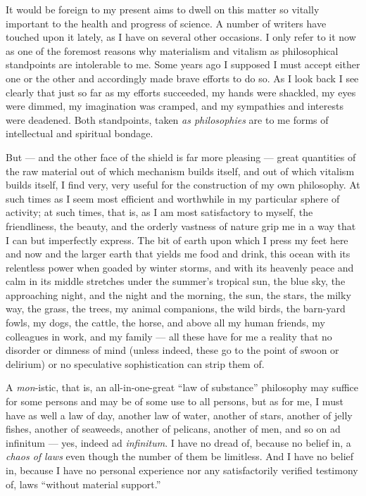 \documentclass[a4paper, 11pt, oneside, polutonikogreek, english, landscape]{article}
\begin{document}
It would be foreign to my present aims to dwell on this matter so vitally important to the health and progress of science. A number of writers have touched upon it lately, as I have on several other occasions. I only refer to it now as one of the foremost reasons why materialism and vitalism as philosophical standpoints are intolerable to me. Some years ago I supposed I must accept either one or the other and accordingly made brave efforts to do so. As I look back I see clearly that just so far as my efforts succeeded, my hands were shackled, my eyes were dimmed, my imagination was cramped, and my sympathies and interests were deadened. Both standpoints, taken \emph{as philosophies} are to me forms of intellectual and spiritual bondage.

But --- and the other face of the shield is far more pleasing --- great quantities of the raw material out of which mechanism builds itself, and out of which vitalism builds itself, I find very, very useful for the construction of my own philosophy. At such times as I seem most efficient and worthwhile in my particular sphere of activity; at such times, that is, as I am most satisfactory to myself, the friendliness, the beauty, and the orderly vastness of nature grip me in a way that I can but imperfectly express. The bit of earth upon which I press my feet here and now and the larger earth that yields me food and drink, this ocean with its relentless power when goaded by winter storms, and with its heavenly peace and calm in its middle stretches under the summer's tropical sun, the blue sky, the approaching night, and the night and the morning, the sun, the stars, the milky way, the grass, the trees, my animal companions, the wild birds, the barn-yard fowls, my dogs, the cattle, the horse, and above all my human friends, my colleagues in work, and my family --- all these have for me a reality that no disorder or dimness of mind (unless indeed, these go to the point of swoon or delirium) or no speculative sophistication can strip them of.

A \emph{mon}-istic, that is, an all-in-one-great ``law of substance'' philosophy may suffice for some persons and may be of some use to all persons, but as for me, I must have as well a law of day, another law of water, another of stars, another of jelly fishes, another of seaweeds, another of pelicans, another of men, and so on ad infinitum --- yes, indeed ad \emph{infinitum}. I have no dread of, because no belief in, a \emph{chaos of laws} even though the number of them be limitless. And I have no belief in, because I have no personal experience nor any satisfactorily verified testimony of, laws ``without material support.''
\end{document}
